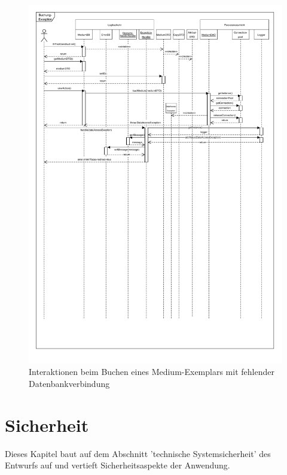 \documentclass{article}
\begin{document}
\begin{figure}[h]
	\hypertarget{Fehlersequenz}{}
    \centering
    \includegraphics[width = 50em]{Sequenzdiagramm-exception-v4.1}
    \caption{Interaktionen beim Buchen eines Medium-Exemplars mit fehlender Datenbankverbindung}
    \label{Sequenzdiagramm}
\end{figure}

\restoregeometry
\newpage

\section{Sicherheit}
Dieses Kapitel baut auf dem Abschnitt 'technische Systemsicherheit' des Entwurfs auf und vertieft Sicherheitsaspekte der Anwendung.
\end{document}
